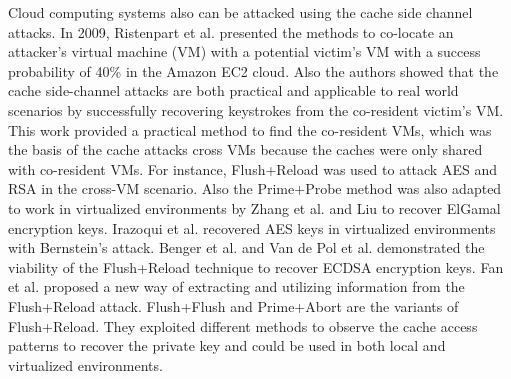 Cloud computing systems also can be attacked using the cache side channel attacks.
In 2009, Ristenpart et al. \cite{get-off-my-cloud} presented the methods to co-locate an attacker’s virtual machine (VM) with a potential victim’s VM with a success probability of 40\% in the Amazon EC2 cloud.
 Also the authors  showed that the cache side-channel attacks are both practical and applicable to real world scenarios by successfully recovering keystrokes from the co-resident victim’s VM.
This work provided a practical method to find the co-resident VMs, which was the basis of the cache attacks cross VMs because the caches were only shared with co-resident VMs. 
For instance, Flush+Reload was used to attack AES \cite{Irazoqui2014} and RSA\cite{flushreload} in the cross-VM scenario.
Also the Prime+Probe method was also
adapted to work in virtualized environments by Zhang et al. \cite{YinqianZhang2012-cross-vm} and Liu \cite{liu2015last} to recover ElGamal encryption keys.
Irazoqui et al. \cite{fine2014} recovered AES keys in virtualized environments with Bernstein’s attack.
Benger et al. \cite{Benger2014} and Van de Pol et al. \cite{Van2015} demonstrated the viability of the Flush+Reload technique to recover ECDSA encryption keys.
Fan et al. \cite{Fan2016} proposed a new way of extracting and utilizing information from the Flush+Reload attack.
Flush+Flush \cite{gruss2016flush} and Prime+Abort \cite{disselkoen2017prime+abort} are the variants of Flush+Reload.
They exploited different methods to observe the cache access patterns to recover the private key and could be used in both local and virtualized environments.





